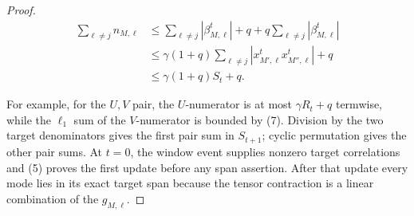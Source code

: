 \begin{lemma}
\begin{proof}
\[
\begin{aligned}
\sum_{\ell\ne j}n_{M,\ell}
&\le \sum_{\ell\ne j}|\beta_{M,\ell}^t|
 +q+q\sum_{\ell\ne j}|\beta_{M,\ell}^t|\\
&\le\gamma(1+q)\sum_{\ell\ne j}
|x_{M',\ell}^tx_{M'',\ell}^t|+q\\
&\le\gamma(1+q)S_t+q.
\end{aligned}
\tag{7}
\]

For example, for the \(U,V\) pair, the \(U\)-numerator is at most
\(\gamma R_t+q\) termwise, while the \(\ell_1\) sum of the \(V\)-numerator
is bounded by (7). Division by the two target denominators gives the first
pair sum in \(S_{t+1}\); cyclic permutation gives the other pair sums. At
\(t=0\), the window event supplies nonzero target correlations and (5)
proves the first update before any span assertion. After that update every
mode lies in its exact target span because the tensor contraction is a linear
combination of the \(g_{M,\ell}\). 


\end{proof}
\end{lemma}
